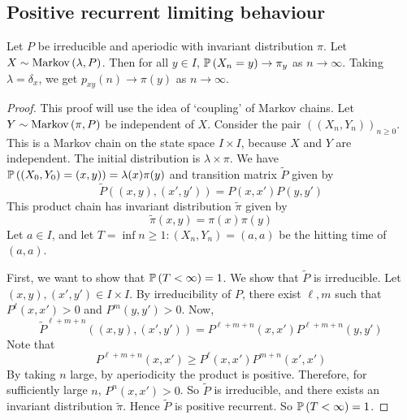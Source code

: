 \subsection{Positive recurrent limiting behaviour}
\begin{theorem}
	Let \( P \) be irreducible and aperiodic with invariant distribution \( \pi \).
	Let \( X \sim \operatorname{Markov}\left({\lambda, P}\right) \).
	Then for all \( y \in I \), \( \mathbb{P}\left({X_n = y}\right) \to \pi_y \) as \( n \to \infty \).
	Taking \( \lambda = \delta_x \), we get \( p_{xy}(n) \to \pi(y) \) as \( n \to \infty \).
\end{theorem}
\begin{proof}
	This proof will use the idea of `coupling' of Markov chains.
	Let \( Y \sim \operatorname{Markov}\left({\pi, P}\right) \) be independent of \( X \).
	Consider the pair \( ((X_n, Y_n))_{n \geq 0} \).
	This is a Markov chain on the state space \( I \times I \), because \( X \) and \( Y \) are independent.
	The initial distribution is \( \lambda \times \pi \).
	We have \( \mathbb{P}\left({(X_0, Y_0) = (x,y)}\right) = \lambda(x) \pi(y) \) and transition matrix \( \widetilde P \) given by
	\[
		\widetilde P((x,y), (x',y')) = P(x,x') P(y,y')
	\]
	This product chain has invariant distribution \( \widetilde \pi \) given by
	\[
		\widetilde \pi(x,y) = \pi(x) \pi(y)
	\]
	Let \( a \in I \), and let \( T = \inf{n \geq 1 \colon (X_n, Y_n) = (a,a)} \) be the hitting time of \( (a,a) \).

	First, we want to show that \( \mathbb{P}\left({T < \infty}\right) = 1 \).
	We show that \( \widetilde P \) is irreducible.
	Let \( (x,y), (x',y') \in I \times I \).
	By irreducibility of \( P \), there exist \( \ell, m \) such that \( P^\ell(x,x') > 0 \) and \( P^m(y,y') > 0 \).
	Now,
	\[
		\widetilde P^{\ell + m + n}((x,y), (x', y')) = P^{\ell+m+n}(x,x')P^{\ell+m+n}(y,y')
	\]
	Note that
	\[
		P^{\ell+m+n}(x,x') \geq P^\ell(x,x') P^{m+n}(x',x')
	\]
	By taking \( n \) large, by aperiodicity the product is positive.
	Therefore, for sufficiently large \( n \), \( P^n(x,x') > 0 \).
	So \( \widetilde P \) is irreducible, and there exists an invariant distribution \( \widetilde \pi \).
	Hence \( \widetilde P \) is positive recurrent.
	So \( \mathbb{P}\left({T < \infty}\right) = 1 \).


\end{proof}
